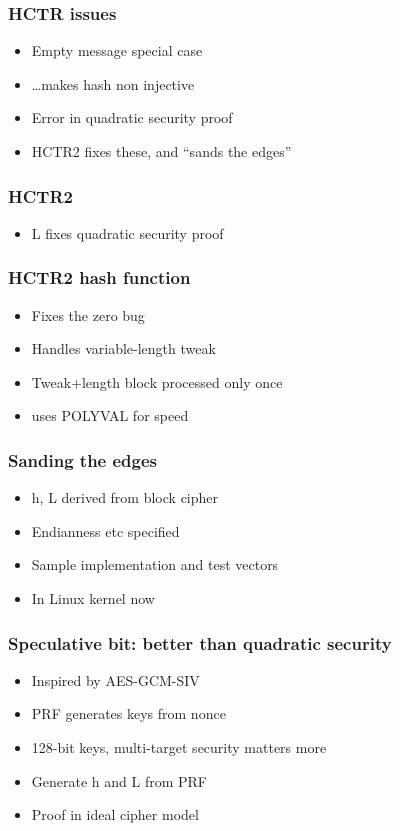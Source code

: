 \documentclass{beamer}
\begin{document}
\begin{frame}

\frametitle{HCTR issues}

\begin{itemize}
    \item Empty message special case
    \item …makes hash non injective
    \item Error in quadratic security proof
    \item HCTR2 fixes these, and “sands the edges”
\end{itemize}
\end{frame}

\begin{frame}

\frametitle{HCTR2}
\begin{figure}

\end{figure}
\begin{itemize}
    \item L fixes quadratic security proof
\end{itemize}

\end{frame}

\begin{frame}

\frametitle{HCTR2 hash function}

\begin{itemize}
    \item Fixes the zero bug
    \item Handles variable-length tweak
    \item Tweak+length block processed only once
    \item uses POLYVAL for speed
\end{itemize}
\end{frame}

\begin{frame}

\frametitle{Sanding the edges}

\begin{itemize}
    \item h, L derived from block cipher
    \item Endianness etc specified
    \item Sample implementation and test vectors
    \item In Linux kernel now
\end{itemize}
\end{frame}

\begin{frame}

\frametitle{Speculative bit: better than quadratic security}

\begin{itemize}
    \item Inspired by AES-GCM-SIV
    \item PRF generates keys from nonce
    \item 128-bit keys, multi-target security matters more
    \item Generate h and L from PRF
    \item Proof in ideal cipher model
\end{itemize}
\end{frame}
\end{document}
